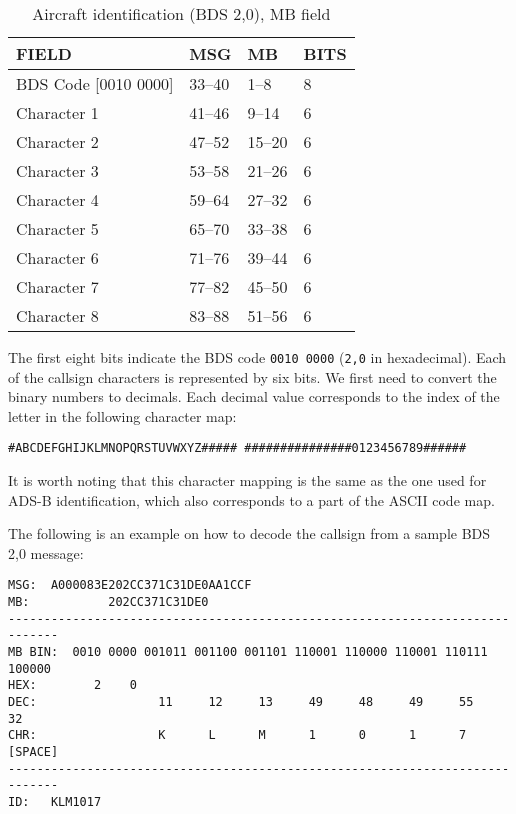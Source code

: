 \begin{table}[ht]
\centering
\caption{Aircraft identification (BDS 2,0), MB field}
\label{tb:bds30}
\begin{tabular}{|l|l|l|l|}
\hline
\textbf{FIELD} & \textbf{MSG} & \textbf{MB} & \textbf{BITS} \\ \hline
BDS Code {[}0010 0000{]} & 33--40 & 1--8 & 8 \\ \hline
Character 1 & 41--46 & 9--14 & 6 \\ \hline
Character 2 & 47--52 & 15--20 & 6 \\ \hline
Character 3 & 53--58 & 21--26 & 6 \\ \hline
Character 4 & 59--64 & 27--32 & 6 \\ \hline
Character 5 & 65--70 & 33--38 & 6 \\ \hline
Character 6 & 71--76 & 39--44 & 6 \\ \hline
Character 7 & 77--82 & 45--50 & 6 \\ \hline
Character 8 & 83--88 & 51--56 & 6 \\ \hline
\end{tabular}
\end{table}


The first eight bits indicate the BDS code \texttt{0010 0000} (\texttt{2,0} in hexadecimal). Each of the callsign characters is represented by six bits. We first need to convert the binary numbers to decimals. Each decimal value corresponds to the index of the letter in the following character map:

\begin{verbatim}
#ABCDEFGHIJKLMNOPQRSTUVWXYZ##### ###############0123456789######
\end{verbatim}

It is worth noting that this character mapping is the same as the one used for ADS-B identification, which also corresponds to a part of the ASCII code map.

The following is an example on how to decode the callsign from a sample BDS 2,0 message:

\begin{verbatim}
MSG:  A000083E202CC371C31DE0AA1CCF
MB:           202CC371C31DE0
-----------------------------------------------------------------------------
MB BIN:  0010 0000 001011 001100 001101 110001 110000 110001 110111 100000
HEX:        2    0
DEC:                 11     12     13     49     48     49     55     32
CHR:                 K      L      M      1      0      1      7     [SPACE]
-----------------------------------------------------------------------------
ID:   KLM1017
\end{verbatim}

